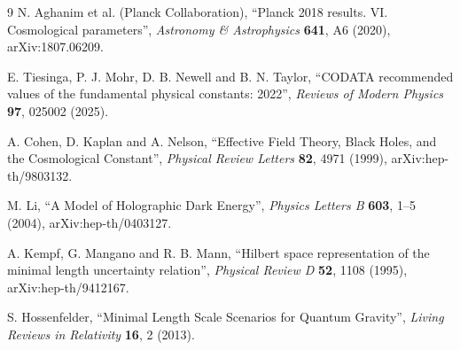 \documentclass[11pt,a4paper]{article}
\begin{document}
\begin{thebibliography}{9}
N. Aghanim et al. (Planck Collaboration),
``Planck 2018 results. VI. Cosmological parameters'',
\emph{Astronomy \& Astrophysics} \textbf{641}, A6 (2020),
arXiv:1807.06209.

E. Tiesinga, P. J. Mohr, D. B. Newell and B. N. Taylor,
``CODATA recommended values of the fundamental physical constants: 2022'',
\emph{Reviews of Modern Physics} \textbf{97}, 025002 (2025).

A. Cohen, D. Kaplan and A. Nelson,
``Effective Field Theory, Black Holes, and the Cosmological Constant'',
\emph{Physical Review Letters} \textbf{82}, 4971 (1999),
arXiv:hep-th/9803132.

M. Li,
``A Model of Holographic Dark Energy'',
\emph{Physics Letters B} \textbf{603}, 1--5 (2004),
arXiv:hep-th/0403127.

A. Kempf, G. Mangano and R. B. Mann,
``Hilbert space representation of the minimal length uncertainty relation'',
\emph{Physical Review D} \textbf{52}, 1108 (1995),
arXiv:hep-th/9412167.

S. Hossenfelder,
``Minimal Length Scale Scenarios for Quantum Gravity'',
\emph{Living Reviews in Relativity} \textbf{16}, 2 (2013).
\end{thebibliography}
\end{document}
